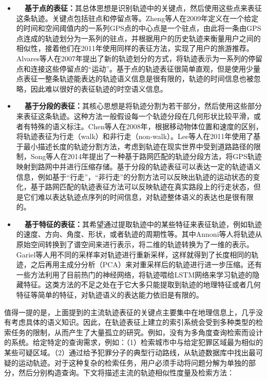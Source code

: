 \begin{itemize}
    \item \textbf{~~基于点的表征：}其总体思想是识别轨迹中的关键点，然后使用这些点来表征这条轨迹。关键点包括驻点和停留点等。Zheng等人\cite{zheng2009mining}在2009年定义在一个给定的时间和空间阈值内的一系列GPS点的中心点是一个驻点，由此将一条由GPS点连成的轨迹划分为一系列的驻点，并根据用户的历史轨迹来衡量用户之间的相似性，接着他们在2011年使用同样的表征方法\cite{zheng2011learning}，实现了用户的旅游推荐。Alvares等人\cite{alvares2007model}在2007年提出了新的轨迹划分的方式，将轨迹表示为一系列的停留点和连接这些停留点的“运动”。基于点的轨迹表征很简单直观，但是使用少量点表征一整条轨迹能表达的轨迹语义信息是很有限的，轨迹的时间信息也被忽略，因此难以很好的表征轨迹的时空语义信息。

    \item \textbf{~~基于分段的表征：}其核心思想是将轨迹分割为若干部分，然后使用这些部分来表征这条轨迹。这种方法一般假设每一个轨迹分段在几何形状比较平滑，或者有特殊的语义标注。Chen等人\cite{chen2009trajectory}在2008年，根据移动物体位置和速度的区别，将轨迹表征为行走（walk）和非行走（non-walk）。Lee等人\cite{lee2011trajectory}在2011年使用了基于最小描述长度的轨迹分割方法，考虑到轨迹在现实世界中受到道路路径的限制，Song等人\cite{paefgen2011gps}在2014年提出了一种基于路网匹配的轨迹分段方法，将GPS轨迹映射到路网中并进行压缩存储。基于分段的轨迹表征可以表达一定的轨迹语义信息，例如基于“行走”，“非行走”的分割方法可以反映出轨迹的运动状态的变化，基于路网匹配的轨迹表征方法可以反映轨迹在真实路段上的行走状态，但是它们难以表达轨迹点序列的时间信息，对轨迹整体语义的表达也是很有限的。

    \item \textbf{~~基于特征的表征：}其希望通过提取轨迹中的某些特征来表征轨迹，例如轨迹的速度、方向、角度、形状，或者轨迹的周期性\cite{annoni2012analysis}等。其中Annoni等人\cite{annoni2012analysis}将轨迹从原始空间转换到了谱空间来进行表示，将二维的轨迹转换为了一维的表示。Gariel等人\cite{gariel2011trajectory}用不同的采样率对轨迹进行重新采样，这样就得到了长度相同的轨迹，之后再用主成分分析（PCA）来对重采样后的轨迹进行进一步压缩。还有一些方法利用了目前热门的神经网络，将轨迹喂给LSTM网络来学习轨迹的隐藏特征\cite{ardakani2017encoding,gao2017identifying}。这类方法的不足之处在于它大多只能提取到轨迹的地理特征或者几何特征等简单的特征，对轨迹语义的表达能力依旧是有限的。
\end{itemize}

值得一提的是，上面提到的主流轨迹表征的关键点主要集中在地理信息上，几乎没有考虑具体的语义知识。因此，在轨迹表征上建立的索引系统会受到多种类型的检索任务的限制，从而产生了大量孤立的研究。例如，没有为多角度查询检索而设计的系统。给定特定的查询需求，例如：（1）检索城市中与给定犯罪区域最为相似的某些可疑区域。（2）通过给予犯罪分子的典型行动路线，从轨迹数据库中找出最可疑的运动轨迹。对于这种复杂的检索任务，用户必须手动将问题分解为单独的部分，然后分别构造查询。下文将描述主流的轨迹相似性度量及检索方法：





